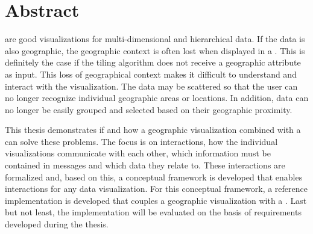 \chapter*{Abstract}


\tmaps{} are good visualizations for multi-dimensional and hierarchical data.
If the data is also geographic, the geographic context is often lost when displayed in a \tmap{}.
This is definitely the case if the tiling algorithm does not receive a geographic attribute as input.
This loss of geographical context makes it difficult to understand and interact with the visualization.
The data may be scattered so that the user can no longer recognize individual geographic areas or locations.
In addition, data can no longer be easily grouped and selected based on their geographic proximity.

This thesis demonstrates if and how a geographic visualization combined with a \tmap{} can solve these problems.
The focus is on interactions, how the individual visualizations communicate with each other, which information must be contained in messages and which data they relate to.
These interactions are formalized and, based on this, a conceptual framework is developed that enables interactions for any data visualization.
For this conceptual framework, a reference implementation is developed that couples a geographic visualization with a \tmap{}.
Last but not least, the implementation will be evaluated on the basis of requirements developed during the thesis.

